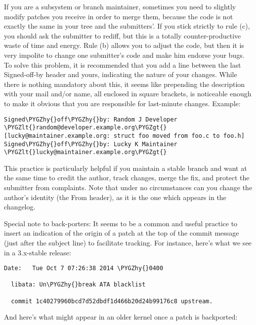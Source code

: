 \documentclass[a4paper,8pt,english]{sphinxmanual}
\def\PYGZlt{\char`\<}
\def\PYGZgt{\char`\>}
\def\PYGZhy{\char`\-}
\begin{document}
If you are a subsystem or branch maintainer, sometimes you need to slightly
modify patches you receive in order to merge them, because the code is not
exactly the same in your tree and the submitters'. If you stick strictly to
rule (c), you should ask the submitter to rediff, but this is a totally
counter-productive waste of time and energy. Rule (b) allows you to adjust
the code, but then it is very impolite to change one submitter's code and
make him endorse your bugs. To solve this problem, it is recommended that
you add a line between the last Signed-off-by header and yours, indicating
the nature of your changes. While there is nothing mandatory about this, it
seems like prepending the description with your mail and/or name, all
enclosed in square brackets, is noticeable enough to make it obvious that
you are responsible for last-minute changes. Example:

\begin{Verbatim}[commandchars=\\\{\}]
Signed\PYGZhy{}off\PYGZhy{}by: Random J Developer \PYGZlt{}random@developer.example.org\PYGZgt{}
[lucky@maintainer.example.org: struct foo moved from foo.c to foo.h]
Signed\PYGZhy{}off\PYGZhy{}by: Lucky K Maintainer \PYGZlt{}lucky@maintainer.example.org\PYGZgt{}
\end{Verbatim}

This practice is particularly helpful if you maintain a stable branch and
want at the same time to credit the author, track changes, merge the fix,
and protect the submitter from complaints. Note that under no circumstances
can you change the author's identity (the From header), as it is the one
which appears in the changelog.

Special note to back-porters: It seems to be a common and useful practice
to insert an indication of the origin of a patch at the top of the commit
message (just after the subject line) to facilitate tracking. For instance,
here's what we see in a 3.x-stable release:

\begin{Verbatim}[commandchars=\\\{\}]
Date:   Tue Oct 7 07:26:38 2014 \PYGZhy{}0400

  libata: Un\PYGZhy{}break ATA blacklist

  commit 1c40279960bcd7d52dbdf1d466b20d24b99176c8 upstream.
\end{Verbatim}

And here's what might appear in an older kernel once a patch is backported:
\end{document}
